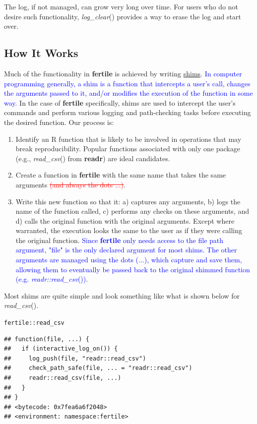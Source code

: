 \documentclass[APA,LATO1COL]{WileyNJD-v2}\usepackage[]{graphicx}\usepackage[]{color}
\makeatletter
\newcommand{\hlopt}[1]{\textcolor[rgb]{0,0,0}{#1}}%
\newcommand{\hlstd}[1]{\textcolor[rgb]{0.345,0.345,0.345}{#1}}%
\newenvironment{kframe}{%
 \def\at@end@of@kframe{}%
 \ifinner\ifhmode%
  \def\at@end@of@kframe{\end{minipage}}%
  \begin{minipage}{\columnwidth}%
 \fi\fi%
 \def\FrameCommand##1{\hskip\@totalleftmargin \hskip-\fboxsep
 \colorbox{shadecolor}{##1}\hskip-\fboxsep
     \hskip-\linewidth \hskip-\@totalleftmargin \hskip\columnwidth}%
 \MakeFramed {\advance\hsize-\width
   \@totalleftmargin\z@ \linewidth\hsize
   \@setminipage}}%
 {\par\unskip\endMakeFramed%
 \at@end@of@kframe}
\newenvironment{knitrout}{}{} %
\newcommand{\R}{\textsf{R}\xspace}
\newcommand{\pkg}[1]{\textbf{#1}}
\newcommand{\func}[1]{\textit{#1}()}
\makeatother
\begin{document}
The log, if not managed, can grow very long over time. For users who do not desire such functionality, \func{log\_clear} provides a way to erase the log and start over.




\subsection{How It Works}

Much of the functionality in \pkg{fertile} is achieved by writing \href{https://en.wikipedia.org/wiki/Shim_(computing)}{shims}. \textcolor{blue}{{In computer programming generally, a shim is a function that intercepts a user's call, changes the arguments passed to it, and/or modifies the execution of the function in some way.}} In the case of \pkg{fertile} specifically, shims are used to intercept the user's commands and perform various logging and path-checking tasks before executing the desired function. Our process is:

\begin{enumerate}[noitemsep]
\item Identify an \R function that is likely to be involved in operations that may break reproducibility. Popular functions associated with only one package (e.g., \func{read\_csv} from \pkg{readr}) are ideal candidates.
\item Create a function in \pkg{fertile} with the same name that takes the same arguments \textcolor{red}{\st{(and always the dots ...)}}.
\item Write this new function so that it: a) captures any arguments, b) logs the name of the function called, c) performs any checks on these arguments, and d) calls the original function with the original arguments. Except where warranted, the execution looks the same to the user as if they were calling the original function. \textcolor{blue}{Since \pkg{fertile} only needs access to the file path argument, "file" is the only declared argument for most shims. The other arguments are managed using the dots (...), which capture and save them, allowing them to eventually be passed back to the original shimmed function (e.g. \func{readr::read\_csv})}.

\end{enumerate}
Most shims are quite simple and look something like what is shown below for \func{read\_csv}. 

\begin{knitrout}
\color{fgcolor}\begin{kframe}
\begin{alltt}
\hlstd{fertile}\hlopt{::}\hlstd{read_csv}
\end{alltt}
\begin{verbatim}
## function(file, ...) {
##   if (interactive_log_on()) {
##     log_push(file, "readr::read_csv")
##     check_path_safe(file, ... = "readr::read_csv")
##     readr::read_csv(file, ...)
##   }
## }
## <bytecode: 0x7fea6a6f2048>
## <environment: namespace:fertile>
\end{verbatim}
\end{kframe}
\end{knitrout}
\end{document}
